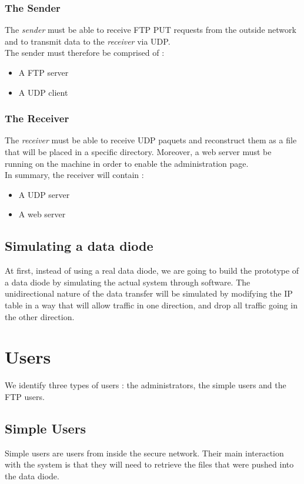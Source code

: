 \documentclass[a4paper,11pt]{article}
\begin{document}
\subsubsection{The Sender}
The \textit{sender} must be able to receive FTP PUT requests from the outside network and to transmit data to the \textit{receiver} via UDP.\\

The sender must therefore be comprised of :
\begin{itemize}
\item{A FTP server}
\item{A UDP client}
\end{itemize} 

\subsubsection{The Receiver}
The \textit{receiver} must be able to receive UDP paquets and reconstruct them as a file that will be placed in a specific directory. Moreover, a web server must be running on the machine in order to enable the administration page.\\

In summary, the receiver will contain :
\begin{itemize}
\item{A UDP server}
\item{A web server}
\end{itemize}

\subsection{Simulating a data diode}
At first, instead of using a real data diode, we are going to build the prototype of a data diode by simulating the actual system through software. The unidirectional nature of the data transfer will be simulated by modifying the IP table in a way that will allow traffic in one direction, and drop all traffic going in the other direction.


\section{Users}
We identify three types of users : the administrators, the simple users and the FTP users.
\subsection{Simple Users}
Simple users are users from inside the secure network. Their main interaction with the system is that they will need to retrieve the files that were pushed into the data diode.
\end{document}
